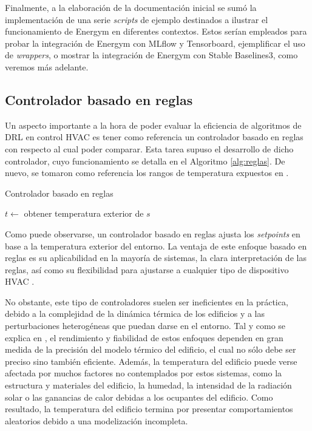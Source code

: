 Finalmente, a la elaboración de la documentación inicial se sumó la implementación de una serie \textit{scripts} de ejemplo destinados a ilustrar el funcionamiento de Energym en diferentes contextos. Estos serían empleados para probar la integración de Energym con MLflow y Tensorboard, ejemplificar el uso de \textit{wrappers}, o mostrar la integración de Energym con Stable Baselines3, como veremos más adelante.

\subsection{Controlador basado en reglas}
Un aspecto importante a la hora de poder evaluar la eficiencia de algoritmos de DRL en control HVAC es tener como referencia un controlador basado en reglas con respecto al cual poder comparar. Esta tarea supuso el desarrollo de dicho controlador, cuyo funcionamiento se detalla en el Algoritmo \ref{alg:reglas}. De nuevo, se tomaron como referencia los rangos de temperatura expuestos en \cite{center2013determining}.

\begin{algorithm}
\caption{Controlador basado en reglas}
\label{alg:reglas}
\DontPrintSemicolon
\LinesNumbered
{}

$t \leftarrow$ obtener temperatura exterior de $s$\;



\end{algorithm}

Como puede observarse, un controlador basado en reglas ajusta los \textit{setpoints} en base a la temperatura exterior del entorno. La ventaja de este enfoque basado en reglas es su aplicabilidad en la mayoría de sistemas, la clara interpretación de las reglas, así como su flexibilidad para ajustarse a cualquier tipo de dispositivo HVAC \cite{mavrik2011advanced}. 

No obstante, este tipo de controladores suelen ser ineficientes en la práctica, debido a la complejidad de la dinámica térmica de los edificios y a las perturbaciones heterogéneas que puedan darse en el entorno. Tal y como se explica en \cite{wei2017deep, yang2015reinforcement}, el rendimiento y fiabilidad de estos enfoques dependen en gran medida de la precisión del modelo térmico del edificio, el cual no sólo debe ser preciso sino también eficiente. Además, la temperatura del edificio puede verse afectada por muchos factores no contemplados por estos sistemas, como la estructura y materiales del edificio, la humedad, la intensidad de la radiación solar o las ganancias de calor debidas a los ocupantes del edificio. Como resultado, la temperatura del edificio termina por presentar comportamientos aleatorios debido a una modelización incompleta. 

